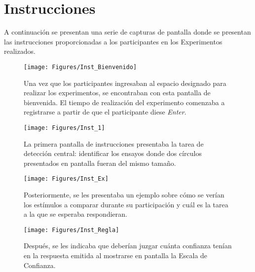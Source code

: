 
\chapter{Instrucciones} %

\label{App_Inst} %

A continuación se presentan una serie de capturas de pantalla donde se presentan las instrucciones proporcionadas a los participantes en los Experimentos realizados.\\

\begin{figure}[th]
\centering
\texttt{[image: Figures/Inst\_Bienvenido]} 
\decoRule
\caption[Pantalla de Bienvenida]{Una vez que los participantes ingresaban al espacio designado para realizar los experimentos, se encontraban con esta pantalla de bienvenida. El tiempo de realización del experimento comenzaba a registrarse a partir de que el participante diese \textit{Enter}.}
\label{fig:csv}
\end{figure}

\begin{figure}[th]
\centering
\texttt{[image: Figures/Inst\_1]} 
\decoRule
\caption[Instrucciones principales]{La primera pantalla de instrucciones presentaba la tarea de detección central: identificar los ensayos donde dos círculos presentados en pantalla fueran del mismo tamaño.}
\label{fig:csv}
\end{figure}

\begin{figure}[th]
\centering
\texttt{[image: Figures/Inst\_Ex]} 
\decoRule
\caption[Presentación de ejemplo]{Posteriormente, se les presentaba un ejemplo sobre cómo se verían los estímulos a comparar durante su participación y cuál es la tarea a la que se esperaba respondieran.}
\label{fig:csv}
\end{figure}

\begin{figure}[th]
\centering
\texttt{[image: Figures/Inst\_Regla]} 
\decoRule
\caption[Presentación de la tarea con Escala de Confianza]{Después, se les indicaba que deberían juzgar cuánta confianza tenían en la respuesta emitida al mostrarse en pantalla la Escala de Confianza.}
\label{fig:csv}
\end{figure}

